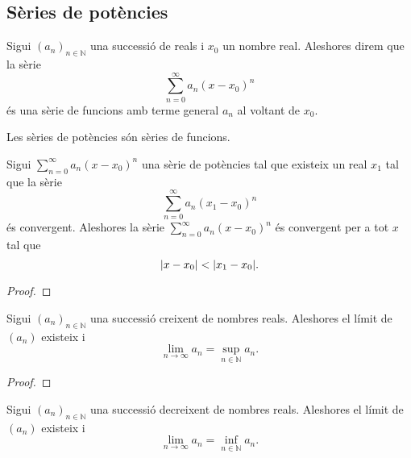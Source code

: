 \documentclass[../Apunts.tex]{subfiles}
\begin{document}
	\subsection{Sèries de potències}
	\begin{definition}
		\label{def:sèrie de potències}
		Sigui \((a_{n})_{n\in\mathbb{N}}\) una successió de reals i \(x_{0}\) un nombre real. Aleshores direm que la sèrie
		\[\sum_{n=0}^{\infty}a_{n}(x-x_{0})^{n}\]
		és una sèrie de funcions amb terme general \(a_{n}\) al voltant de \(x_{0}\).
	\end{definition}
	\begin{observation}
		\label{obs:les sèries de potències són sèries de funcions}
		Les sèries de potències són sèries de funcions.
	\end{observation}
	\begin{proposition}
		\label{prop:radi de convergència d'una sèrie de potències}
		Sigui \(\sum_{n=0}^{\infty}a_{n}(x-x_{0})^{n}\) una sèrie de potències tal que existeix un real \(x_{1}\) tal que la sèrie
		\[\sum_{n=0}^{\infty}a_{n}(x_{1}-x_{0})^{n}\]
		és convergent. Aleshores la sèrie \(\sum_{n=0}^{\infty}a_{n}(x-x_{0})^{n}\) és convergent per a tot \(x\) tal que
		\[\abs{x-x_{0}}<\abs{x_{1}-x_{0}}.\]
		\begin{proof}
		\end{proof}
	\end{proposition}
	\begin{lemma}
		\label{lema:les successions creixents tenen límit i aquest és el suprem de la successió}
		Sigui \((a_{n})_{n\in\mathbb{N}}\) una successió creixent de nombres reals. Aleshores el límit de \((a_{n})\) existeix i
		\[\lim_{n\to\infty}a_{n}=\sup_{n\in\mathbb{N}}a_{n}.\]
		\begin{proof}
		\end{proof}
	\end{lemma}
	\begin{corollary}
		\label{cor:les successions decreixent tenen límit i aquest és el ínfim de la successió}
		Sigui \((a_{n})_{n\in\mathbb{N}}\) una successió decreixent de nombres reals. Aleshores el límit de \((a_{n})\) existeix i
		\[\lim_{n\to\infty}a_{n}=\inf_{n\in\mathbb{N}}a_{n}.\]
	\end{corollary}
\end{document}
